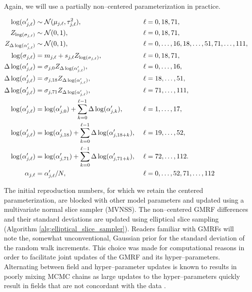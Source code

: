 Again, we will use a partially non--centered parameterization in practice.
\begin{small}
	\begin{align}
	\log(\alpha^\prime_{j,\ell}) &\sim \mcN(\mu_{j,\ell},\tau_{j,\ell}^2),&\ &\ell= 0,18,71, \nonumber\\
	Z_{\log(\sigma_{j,\ell})} &\sim \mcN(0,1),&\ &\ell=0,18,71, \nonumber \\
	Z_{\Delta\log(\alpha^\prime_{j,\ell})} &\sim \mcN(0,1),&\ &\ell=0,\dots,16,18,\dots,51,71,\dots,111, \nonumber \\ 
	\log(\sigma_{j,\ell}) &= m_{j,\ell} + s_{j,\ell}Z_{\log(\sigma_{j,\ell})},&\ &\ell = 0,18,71,\nonumber\\
	\Delta\log(\alpha^\prime_{j,\ell})&= \sigma_{j,0} Z_{\Delta\log(\alpha^\prime_{j,\ell})},&\ &\ell=0,\dots,16, \nonumber\\
	\Delta\log(\alpha^\prime_{j,\ell})&= \sigma_{j,18} Z_{\Delta\log(\alpha^\prime_{j,\ell})},&\ &\ell=18,\dots,51, \nonumber\\
	\Delta\log(\alpha^\prime_{j,\ell})&= \sigma_{j,71} Z_{\Delta\log(\alpha^\prime_{j,\ell})},&\ &\ell=71,\dots,111, \nonumber\\
	\log(\alpha^\prime_{j,\ell}) &= \log(\alpha^\prime_{j,0}) + \sum_{k=0}^{\ell-1}\Delta\log(\alpha^\prime_{j,k}),&\ &\ell = 1,\dots,17, \nonumber\\
	\log(\alpha^\prime_{j,\ell}) &= \log(\alpha^\prime_{j,18}) + \sum_{k=0}^{\ell-1}\Delta\log(\alpha^\prime_{j,18+k}),&\ &\ell = 19,\dots,52, \nonumber\\
	\log(\alpha^\prime_{j,\ell}) &= \log(\alpha^\prime_{j,71}) + \sum_{k=0}^{\ell-1}\Delta\log(\alpha^\prime_{j,71+k}),&\ &\ell = 72,\dots,112. \nonumber \\
	\alpha_{j,\ell} &= \alpha^\prime_{j,\ell}/N,&\ &\ell=0,\dots,52,71,\dots,112 \nonumber
	\end{align}
\end{small}

The initial reproduction numbers, for which we retain the centered parameterization, are blocked with other model parameters and updated using a multivariate normal slice sampler (MVNSS). The non--centered GMRF differences and their standard deviations are updated 
using elliptical slice sampling (Algorithm \ref{alg:elliptical_slice_sampler}).
Readers familiar with GMRFs will note the, somewhat unconventional, Gaussian prior for the standard deviation of the random walk increments. This choice was made for computational reasons in order to facilitate joint updates of the GMRF and its hyper--parameters. Alternating between field and hyper--parameter updates is known to results in poorly mixing MCMC chains as large updates to the hyper--parameters quickly result in fields that are not concordant with the data  \cite{knorr2002block,murray2010hyper}. 

